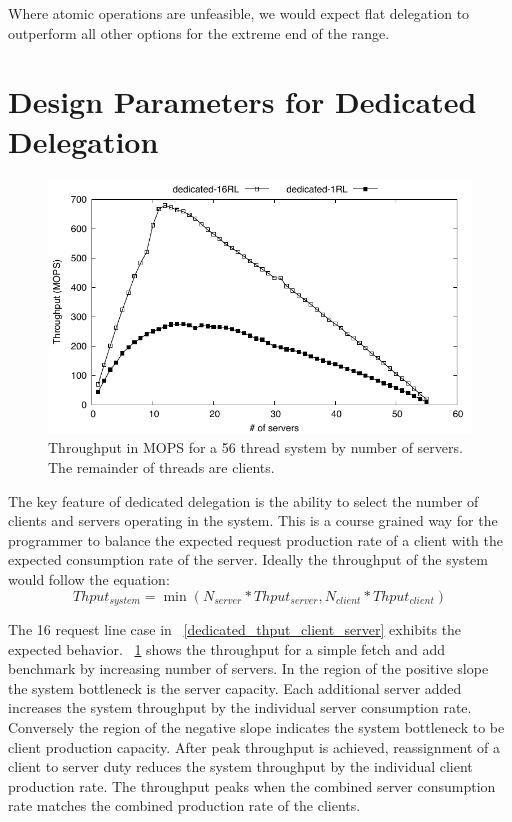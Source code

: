 \documentclass{uicthesi}
\begin{document}
Where atomic operations are unfeasible, we would expect flat delegation to outperform all other options for the extreme end of the range. 

\section{Design Parameters for Dedicated Delegation}
\begin{figure}[ht!]
\centering
\includegraphics[width=0.9\columnwidth]{FIG/dedicated_thput_client_server.pdf}
\caption{Throughput in MOPS for a 56 thread system by number of servers. The remainder of threads are clients.}
\label{fig:dedicated_thput_client_server}
\end{figure}

The key feature of dedicated delegation is the ability to select the number of clients and servers operating in the system. This is a course grained way for the programmer to balance the expected request production rate of a client with the expected consumption rate of the server. Ideally the throughput of the system would follow the equation: 
\begin{displaymath}
Thput_{system} = \min(N_{server} * Thput_{server}, N_{client} * Thput_{client})
\end{displaymath}

The 16 request line case in ~\ref{dedicated_thput_client_server} exhibits the expected behavior. ~\ref{fig:dedicated_thput_client_server} shows the throughput for a simple fetch and add benchmark by increasing number of servers. In the region of the positive slope the system bottleneck is the server capacity. Each additional server added increases the system throughput by the individual server consumption rate. Conversely the region of the negative slope indicates the system bottleneck to be client production capacity. After peak throughput is achieved, reassignment of a client to server duty reduces the system throughput by the individual client production rate. The throughput peaks when the combined server consumption rate matches the combined production rate of the clients. 
\end{document}
